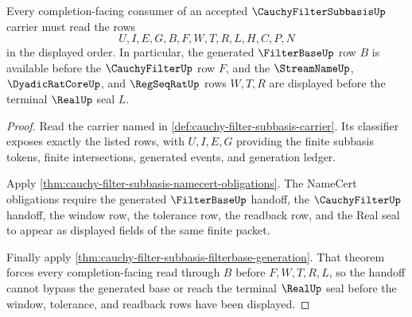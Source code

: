 \begin{theorem}
\label{thm:cauchy-filter-subbasis-completion-handoff}
Every completion-facing consumer of an accepted $\CauchyFilterSubbasisUp$ carrier must read the rows
$$
U,I,E,G,B,F,W,T,R,L,H,C,P,N
$$
in the displayed order. In particular, the generated $\FilterBaseUp$ row $B$ is available before the $\CauchyFilterUp$ row $F$, and the $\StreamNameUp$, $\DyadicRatCoreUp$, and $\RegSeqRatUp$ rows $W,T,R$ are displayed before the terminal $\RealUp$ seal $L$.
\end{theorem}
\begin{proof}
Read the carrier named in \autoref{def:cauchy-filter-subbasis-carrier}. Its classifier exposes exactly the listed rows, with $U,I,E,G$ providing the finite subbasis tokens, finite intersections, generated events, and generation ledger.

Apply \autoref{thm:cauchy-filter-subbasis-namecert-obligations}. The NameCert obligations require the generated $\FilterBaseUp$ handoff, the $\CauchyFilterUp$ handoff, the window row, the tolerance row, the readback row, and the Real seal to appear as displayed fields of the same finite packet.

Finally apply \autoref{thm:cauchy-filter-subbasis-filterbase-generation}. That theorem forces every completion-facing read through $B$ before $F,W,T,R,L$, so the handoff cannot bypass the generated base or reach the terminal $\RealUp$ seal before the window, tolerance, and readback rows have been displayed.
\end{proof}

